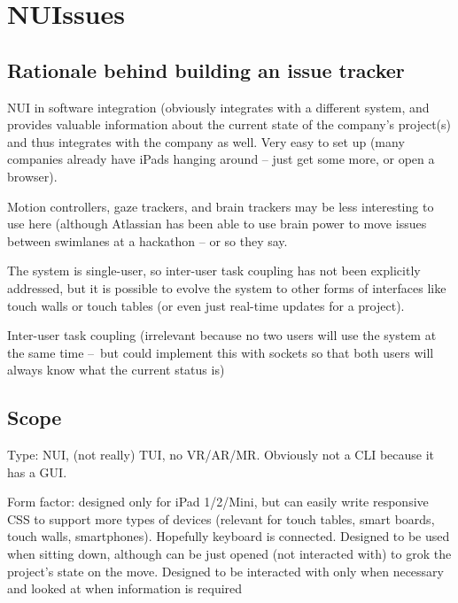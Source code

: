 \section{NUIssues}

\subsection{Rationale behind building an issue tracker}

NUI in software integration (obviously integrates with a different system, and provides valuable information about the current state of the company's project(s) and thus integrates with the company as well. Very easy to set up (many companies already have iPads hanging around – just get some more, or open a browser).

Motion controllers, gaze trackers, and brain trackers may be less interesting to use here (although Atlassian has been able to use brain power to move issues between swimlanes at a hackathon – or so they say.

The system is single-user, so inter-user task coupling has not been explicitly addressed, but it is possible to evolve the system to other forms of interfaces like touch walls or touch tables (or even just real-time updates for a project).

Inter-user task coupling (irrelevant because no two users will use the system at the same time – but could implement this with sockets so that both users will always know what the current status is)

\subsection{Scope}

Type: NUI, (not really) TUI, no VR/AR/MR. Obviously not a CLI because it has a GUI.

Form factor: designed only for iPad 1/2/Mini, but can easily write responsive CSS to support more types of devices (relevant for touch tables, smart boards, touch walls, smartphones). Hopefully keyboard is connected. Designed to be used when sitting down, although can be just opened (not interacted with) to grok the project's state on the move. Designed to be interacted with only when necessary and looked at when information is required

